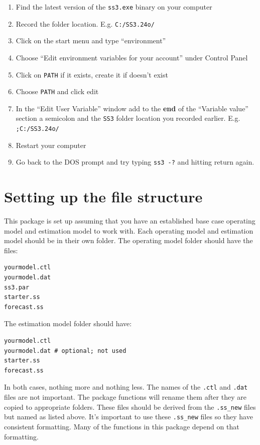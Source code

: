 \documentclass[12pt]{article}
\begin{document}
\begin{enumerate}
  \item Find the latest version of the \texttt{ss3.exe} binary on your computer
  \item Record the folder location. E.g. \texttt{C:/SS3.24o/}
  \item Click on the start menu and type ``environment''
  \item Choose ``Edit environment variables for your account'' under Control 
    Panel
  \item Click on \texttt{PATH} if it exists, create it if doesn't exist
  \item Choose \texttt{PATH} and click edit
  \item In the ``Edit User Variable'' window add to the \textbf{end} of the 
    ``Variable value'' section a semicolon and the \texttt{SS3} folder location you 
    recorded earlier. E.g. \texttt{;C:/SS3.24o/}
  \item Restart your computer
  \item Go back to the DOS prompt and try typing \texttt{ss3 -?} and hitting 
    return again.
\end{enumerate}


\section{Setting up the file structure}
This package is set up assuming that you have an established base case 
operating model and estimation model to work with. Each operating model and 
estimation model should be in their own folder. The operating model folder 
should have the files:

\begin{verbatim}
yourmodel.ctl
yourmodel.dat
ss3.par
starter.ss
forecast.ss
\end{verbatim}

\noindent
The estimation model folder should have:

\begin{verbatim}
yourmodel.ctl
yourmodel.dat # optional; not used
starter.ss
forecast.ss
\end{verbatim}

\noindent
In both cases, nothing more and nothing less. The names of the \texttt{.ctl} 
and \texttt{.dat} files are not important. The package functions will rename 
them after they are copied to appropriate folders. These files should be 
derived from the \texttt{.ss\_new} files but named as listed above. It's 
important to use these \texttt{.ss\_new} files so they have consistent 
formatting. Many of the functions in this package depend on that formatting.
\end{document}
